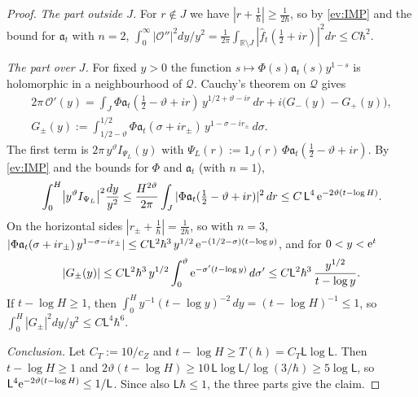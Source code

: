 \begin{proof}
\emph{The part outside $J$.} For $r\notin J$ we have $|r+\tfrac1\hbar|\ge\tfrac1{2\hbar}$, so by \eqref{ev:IMP} and the bound for $\mathfrak a_t$ with $n=2$,
$\int_0^\infty|\mathcal O''|^2dy/y^2=\tfrac1{2\pi}\int_{\mathbb R\setminus J}|\hat f_t(\tfrac12+ir)|^2dr\le C\hbar^2$.

\emph{The part over $J$.} For fixed $y>0$ the function $s\mapsto\Phi(s)\mathfrak a_t(s)y^{1-s}$ is holomorphic in a neighbourhood of $\mathcal Q$. Cauchy's theorem on
$\mathcal Q$ gives
\begin{gather*}
  2\pi\,\mathcal O'(y)=\int_J\Phi \mathfrak a_t(\tfrac12-\vartheta+ir)\,y^{1/2+\vartheta-ir}\,dr+i\bigl(G_-(y)-G_+(y)\bigr),\\
  G_\pm(y):=\int_{1/2-\vartheta}^{1/2}\Phi \mathfrak a_t(\sigma+ir_\pm)\,y^{1-\sigma-ir_\pm}\,d\sigma .
\end{gather*}
The first term is $2\pi\,y^\vartheta I_{\Psi_L}(y)$ with $\Psi_L(r):=1_J(r)\,\Phi \mathfrak a_t(\tfrac12-\vartheta+ir)$. By \eqref{ev:IMP} and the bounds for $\Phi$ and $\mathfrak a_t$ (with $n=1$),
\[
  \int_0^H\bigl|y^\vartheta I_{\Psi_L}\bigr|^2\frac{dy}{y^2}\le\frac{H^{2\vartheta}}{2\pi}\int_J|\Phi \mathfrak a_t(\tfrac12-\vartheta+ir)|^2\,dr
  \le C\,\mathsf L^4\,\mathrm{e}^{-2\vartheta(t-\log H)} .
\]
On the horizontal sides $|r_\pm+\tfrac1\hbar|=\tfrac1{2\hbar}$, so with $n=3$,
$|\Phi \mathfrak a_t(\sigma+ir_\pm)\,y^{1-\sigma-ir_\pm}|\le C\mathsf L^2\hbar^3\,y^{1/2}\,\mathrm{e}^{-(1/2-\sigma)(t-\log y)}$, and for $0<y<\mathrm{e}^t$
\[
  |G_\pm(y)|\le C\mathsf L^2\hbar^3\,y^{1/2}\int_0^\vartheta\mathrm{e}^{-\sigma'(t-\log y)}\,d\sigma'\le C\mathsf L^2\hbar^3\,\frac{y^{1/2}}{t-\log y}.
\]
If $t-\log H\ge1$, then $\int_0^Hy^{-1}(t-\log y)^{-2}\,dy=(t-\log H)^{-1}\le1$, so $\int_0^H|G_\pm|^2dy/y^2\le C\mathsf L^4\hbar^6$.

\emph{Conclusion.} Let $C_T:=10/c_Z$ and $t-\log H\ge T(\hbar)=C_T\mathsf L\log\mathsf L$. Then $t-\log H\ge1$ and
$2\vartheta(t-\log H)\ge10\,\mathsf L\log\mathsf L/\log(3/\hbar)\ge5\log\mathsf L$, so $\mathsf L^4\mathrm{e}^{-2\vartheta(t-\log H)}\le1/\mathsf L$. Since also
$\mathsf L\hbar\le1$, the three parts give the claim. \qedhere


\end{proof}


